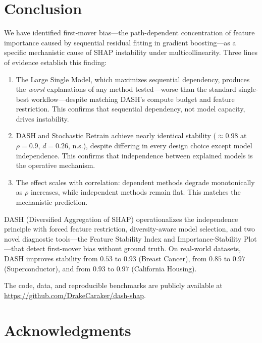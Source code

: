 \documentclass[11pt]{article}
\newcommand{\dash}{\textsc{DASH}}
\newcommand{\rhovar}{\rho}
\begin{document}
\section{Conclusion}
\label{sec:conclusion}

We have identified first-mover bias---the path-dependent concentration of
feature importance caused by sequential residual fitting in gradient
boosting---as a specific mechanistic cause of SHAP instability under
multicollinearity. Three lines of evidence establish this finding:

\begin{enumerate}
  \item The Large Single Model, which maximizes sequential dependency,
    produces the \emph{worst} explanations of any method tested---worse
    than the standard single-best workflow---despite matching \dash{}'s
    compute budget and feature restriction. This confirms that
    sequential dependency, not model capacity, drives instability.
  \item \dash{} and Stochastic Retrain achieve nearly identical
    stability ($\approx 0.98$ at $\rhovar = 0.9$, $d = 0.26$, n.s.),
    despite differing in every design choice except model independence.
    This confirms that independence between explained models is the
    operative mechanism.
  \item The effect scales with correlation: dependent methods degrade
    monotonically as $\rhovar$ increases, while independent methods
    remain flat. This matches the mechanistic prediction.
\end{enumerate}

\dash{} (Diversified Aggregation of SHAP) operationalizes the
independence principle with forced feature restriction, diversity-aware
model selection, and two novel diagnostic tools---the Feature Stability
Index and Importance-Stability Plot---that detect first-mover bias
without ground truth. On real-world datasets, \dash{} improves stability
from $0.53$ to $0.93$ (Breast Cancer), from $0.85$ to $0.97$
(Superconductor), and from $0.93$ to $0.97$ (California Housing).

The code, data, and reproducible benchmarks are publicly available at
\url{https://github.com/DrakeCaraker/dash-shap}.


\section*{Acknowledgments}
\end{document}
